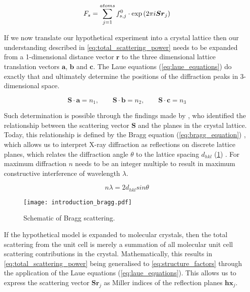 \begin{equation}
    F_s=\sum_{j=1}^{atoms}f_{s,j}^0 \cdot \exp\left(2\pi\\i\boldsymbol{S}\boldsymbol{r}_j\right)
    \label{eq:total_scattering_power}
\end{equation}

If we now translate our hypothetical experiment into a crystal lattice then our understanding described in \cref{eq:total_scattering_power} needs to be expanded from a 1-dimensional distance vector $\boldsymbol{r}$ to the three dimensional lattice translation vectors $\boldsymbol{a}$, $\boldsymbol{b}$ and $\boldsymbol{c}$. The Laue equations (\cref{eq:laue_equations}) do exactly that and ultimately determine the positions of the diffraction peaks in 3-dimensional space.

\begin{equation}
    \boldsymbol{S} \cdot \boldsymbol{a}=n_1, \quad \quad \boldsymbol{S} \cdot \boldsymbol{b}=n_2, \quad \quad \boldsymbol{S} \cdot \boldsymbol{c}=n_3
    \label{eq:laue_equations}
\end{equation}

Such determination is possible through the findings made by \textcite{Bragg1913-cx}, who identified the relationship between the scattering vector $\boldsymbol{S}$ and the planes in the crystal lattice. Today, this relationship is defined by the Bragg equation (\cref{eq:bragg_equation}) \cite{Bragg1913-cx}, which allows us to interpret X-ray diffraction as reflections on discrete lattice planes, which relates the diffraction angle $\theta$ to the lattice spacing $d_{hkl}$ (\cref{fig:introduction_bragg}) \cite{Rupp2010-nc}. For maximum diffraction $n$ needs to be an integer multiple to result in maximum constructive interference of wavelength $\lambda$.

\begin{equation}
    n\lambda=2d_{hkl}sin\theta
    \label{eq:bragg_equation}
\end{equation}

\begin{figure}[H]
    \centering
    \texttt{[image: introduction\_bragg.pdf]}
    \caption{Schematic of Bragg scattering.}
    \label{fig:introduction_bragg}
\end{figure}

If the hypothetical model is expanded to molecular crystals, then the total scattering from the unit cell is merely a summation of all molecular unit cell scattering contributions in the crystal. Mathematically, this results in \cref{eq:total_scattering_power} being generalised to \cref{eq:structure_factors} through the application of the Laue equations (\cref{eq:laue_equations}). This allows us to express the scattering vector $\boldsymbol{S}\boldsymbol{r}_j$ as Miller indices of the reflection planes $\boldsymbol{h}\boldsymbol{x}_j$.

